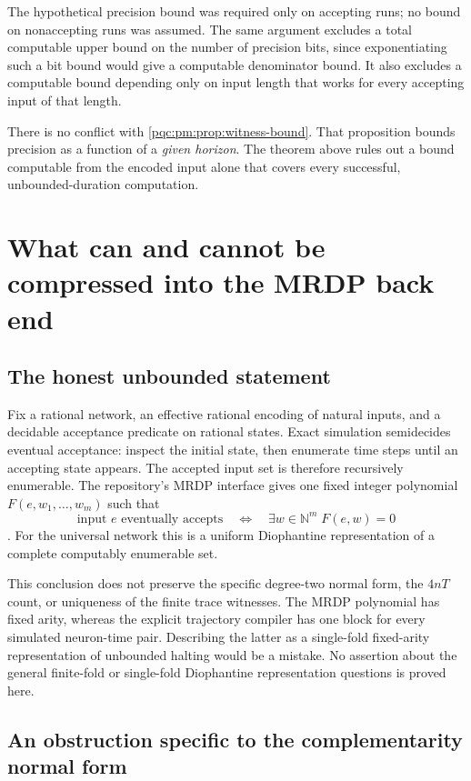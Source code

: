 \documentclass[11pt,letterpaper]{article}
\numberwithin{equation}{section}
\theoremstyle{definition}
\theoremstyle{remark}
\newcommand{\N}{\mathbb N}
\newcommand{\srcmark}[1]{\par\noindent{\small\itshape [source~#1]}\par}
\begin{document}
The hypothetical precision bound was required only on accepting runs; no
bound on nonaccepting runs was assumed. The same argument excludes a total
computable upper bound on the number of precision bits, since exponentiating
such a bit bound would give a computable denominator bound. It also excludes
a computable bound depending only on input length that works for every
accepting input of that length.

There is no conflict with \cref{pqc:pm:prop:witness-bound}. That proposition bounds
precision as a function of a \emph{given horizon}. The theorem above rules
out a bound computable from the encoded input alone that covers every
successful, unbounded-duration computation.

\section{What can and cannot be compressed into the MRDP back end}
\label{pqc:pm:sec:integration}
\srcmark{15}

\subsection{The honest unbounded statement}

Fix a rational network, an effective rational encoding of natural inputs,
and a decidable acceptance predicate on rational states. Exact simulation
semidecides eventual acceptance: inspect the initial state, then enumerate
time steps until an accepting state appears. The accepted input set is
therefore recursively enumerable. The repository's MRDP interface gives
one fixed integer polynomial $F(e,w_1,\ldots,w_m)$ such that
\[
 \text{input $e$ eventually accepts}
 \quad\Longleftrightarrow\quad
 \exists w\in\N^m\;F(e,w)=0
\]
\cite{b62s15-proveit-mrdp}. For the universal network this is a uniform Diophantine
representation of a complete computably enumerable set.

This conclusion does not preserve the specific degree-two normal form,
the $4nT$ count, or uniqueness of the finite trace witnesses. The MRDP
polynomial has fixed arity, whereas the explicit trajectory compiler has
one block for every simulated neuron-time pair. Describing the latter as a
single-fold fixed-arity representation of unbounded halting would be a
mistake. No assertion about the general finite-fold or single-fold
Diophantine representation questions is proved here.

\subsection{An obstruction specific to the complementarity normal form}
\end{document}
